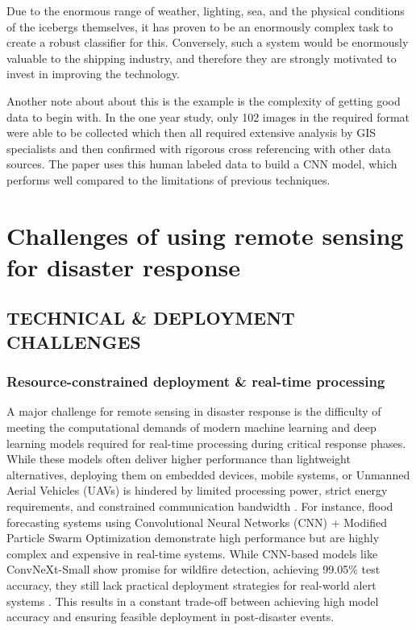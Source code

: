 \documentclass[conference,a4paper]{IEEEtran}
\begin{document}
Due to the enormous range of weather, lighting, sea,  and the physical conditions of the icebergs themselves, it has proven to be an enormously complex task to create a robust classifier for this. Conversely, such a system would be enormously valuable to the shipping industry, and therefore they are strongly motivated to invest in improving the technology.

Another note about about this is the example is the complexity of getting good data to begin with. In the one year study, only 102 images in the required format were able to be collected which then all required extensive analysis by GIS specialists and then confirmed with rigorous cross referencing with other data sources. The paper uses this human labeled data to build a CNN model, which performs well compared to the limitations of previous techniques.




\section{Challenges of using remote sensing for disaster response}


\subsection{TECHNICAL \& DEPLOYMENT CHALLENGES}

\subsubsection{\textbf{Resource-constrained deployment \& real-time processing}}
A major challenge for remote sensing in disaster response is the difficulty of meeting the computational demands of modern machine learning and deep learning models required for real-time processing during critical response phases. While these models often deliver higher performance than lightweight alternatives, deploying them on embedded devices, mobile systems, or Unmanned Aerial Vehicles (UAVs) is hindered by limited processing power, strict energy requirements, and constrained communication bandwidth \cite{elbohy2025fusion}. For instance, flood forecasting systems using Convolutional Neural Networks (CNN) + Modified Particle Swarm Optimization demonstrate high performance but are highly complex and expensive in real-time systems. While CNN-based models like ConvNeXt-Small show promise for wildfire detection, achieving 99.05\% test accuracy, they still lack practical deployment strategies for real-world alert systems \cite{elbohy2025fusion}. This results in a constant trade-off between achieving high model accuracy and ensuring feasible deployment in post-disaster events.
\end{document}
